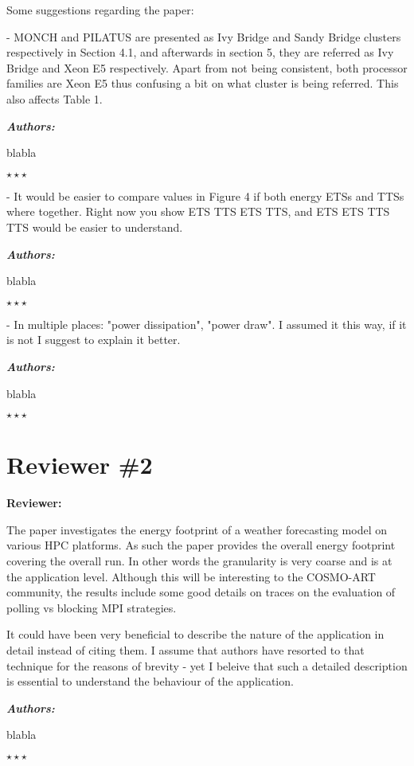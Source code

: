 \documentclass[a4paper,11pt]{article}
\newcounter{question}
\newcommand{\reviewerSay}{\vspace{0.2cm} {\bf \noindent } {\bf Reviewer:} \medskip \par}
\newcommand{\weReply}{\vspace{0.25cm} {\bf \noindent } \addtocounter{question}{1} \textbf{\emph{Authors:}} \medskip \em\par}
\newenvironment{weSay}{\bigskip \weReply \begin{it}}{\end{it}\begin{center} \samepage$\star \star \star$ \end{center}}
\begin{document}
Some suggestions regarding the paper:

- MONCH and PILATUS are presented as Ivy Bridge and Sandy Bridge clusters respectively in Section 4.1, 
and afterwards in section 5, they are referred as Ivy Bridge and Xeon E5 respectively. Apart from not 
being consistent, both processor families are Xeon E5 thus confusing a bit on what cluster is 
being referred. This also affects Table 1.

\begin{weSay}
blabla
\end{weSay}

- It would be easier to compare values in Figure 4 if both energy ETSs and TTSs where together. 
Right now you show ETS TTS ETS TTS, and ETS ETS TTS TTS would be easier to understand.

\begin{weSay}
blabla
\end{weSay}

- In multiple places: "power dissipation", "power draw". I assumed it this way, if it is not 
I suggest to explain it better.

\begin{weSay}
blabla
\end{weSay}


\newpage
\section*{Reviewer \#2}

\reviewerSay
The paper investigates the energy footprint of a weather forecasting model on various HPC platforms. 
As such the paper provides the overall energy footprint covering the overall run. In other words the 
granularity is very coarse and is at the application level. Although this will be interesting to the 
COSMO-ART community, the results include some good details on traces  on the
evaluation of polling vs blocking MPI strategies.

It could have been very beneficial to describe the nature of the application in detail instead of 
citing them. I assume that authors have resorted to that technique for the reasons of brevity  - yet 
I beleive that such a detailed description is essential to understand the behaviour of the application.

\begin{weSay}
blabla
\end{weSay}
\end{document}
